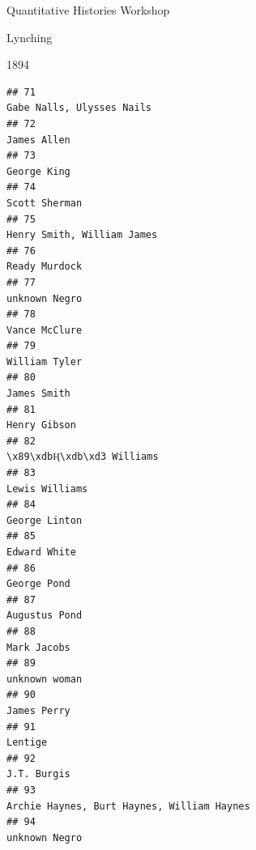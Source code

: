 \documentclass[
  ignorenonframetext,
]{beamer}
\begin{document}
\begin{frame}[fragile]{Quantitative Histories Workshop}
\begin{block}{Lynching}
\begin{block}{1894}
\begin{verbatim}
## 71                                                                                 Gabe Nalls, Ulysses Nails
## 72                                                                                               James Allen
## 73                                                                                               George King
## 74                                                                                             Scott Sherman
## 75                                                                                Henry Smith, William James
## 76                                                                                             Ready Murdock
## 77                                                                                             unknown Negro
## 78                                                                                             Vance McClure
## 79                                                                                             William Tyler
## 80                                                                                               James Smith
## 81                                                                                              Henry Gibson
## 82                                                                                \x89\xdbӉ\xdb\xd3 Williams
## 83                                                                                            Lewis Williams
## 84                                                                                             George Linton
## 85                                                                                              Edward White
## 86                                                                                               George Pond
## 87                                                                                             Augustus Pond
## 88                                                                                               Mark Jacobs
## 89                                                                                             unknown woman
## 90                                                                                               James Perry
## 91                                                                                                   Lentige
## 92                                                                                               J.T. Burgis
## 93                                                                Archie Haynes, Burt Haynes, William Haynes
## 94                                                                                             unknown Negro

\end{verbatim}
\end{block}
\end{block}
\end{frame}
\end{document}
